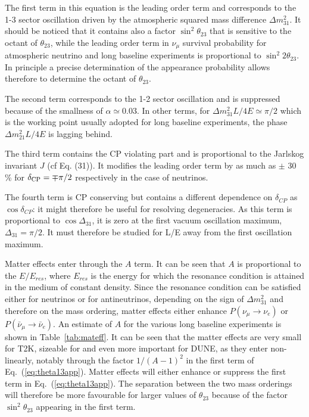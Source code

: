 The first term in this equation is the leading order term and corresponds to the 1-3 sector oscillation driven by the atmospheric squared mass difference $\Delta m^2_{31}$. It should be noticed that it contains also a factor $\sin^2 \theta_{23}$ that is sensitive to the octant of $\theta_{23}$, while the leading order term in $\nu_\mu$ survival probability for atmospheric neutrino and long baseline experiments is proportional to $\sin^2 2 \theta_{23}$. In principle a precise determination of the appearance probability allows therefore to determine the octant of $\theta_{23}$.

The second term corresponds to the 1-2 sector oscillation and is suppressed because of the smallness of $ \alpha \simeq 0.03$. In other terms, for 
$\Delta m^2_{31} L / 4 E \simeq \pi/2$ which is the working point usually adopted for long baseline experiments, the phase $\Delta m^2_{21} L / 4 E$ is lagging behind.

The third term contains the CP violating part and is proportional to the Jarlskog invariant $J$ (cf Eq. (31)). %
It modifies the leading order term by as much as $\pm$ 30 \% for $\delta_{\mathrm{CP}} = \mp \pi/2$ respectively in the case of neutrinos.

The fourth term is CP conserving but contains a different dependence  on $\delta_{CP}$  as  $\cos \delta_{CP}$: it might therefore be useful for resolving degeneracies. As this term is proportional to $\cos \Delta_{31}$, it is zero at the first vacuum oscillation maximum, $\Delta_{31}=\pi/2$. It must therefore be studied for L/E away from the first oscillation maximum. 

Matter effects enter through the $A$ term. It can be seen that $A$ is proportional to the $E/E_{res}$, where $E_{res}$ is the energy for which the resonance condition is attained in the medium of constant density. Since the resonance condition can be satisfied either for neutrinos or for antineutrinos, depending on the sign of $\Delta m^2_{31}$ and therefore on the mass ordering, matter effects either enhance $ P (\nu_\mu \rightarrow \nu_e)$ or  $ P (\bar{\nu}_\mu \rightarrow \bar{\nu}_e)$. 
An estimate of $A$ for the various long baseline experiments is shown in Table~\ref{tab:mateff}.
It can be seen that the matter effects are very small for T2K, sizeable for \nova and even more important for DUNE, as they enter non-linearly, notably through the factor $1/(A-1)^2$ in the first term of Eq.~(\ref{eq:theta13app}). Matter effects will either enhance or suppress the first term in Eq.~(\ref{eq:theta13app}). The separation between the two mass orderings will therefore be more favourable for larger values of $\theta_{23}$ because of the factor $\sin^2 \theta_{23}$ appearing in the first term. 

